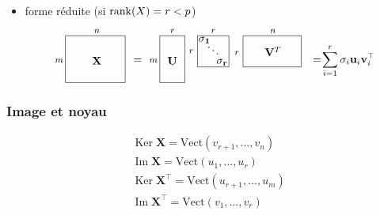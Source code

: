 \documentclass[9pt]{beamer}
\begin{document}
\begin{frame}
\begin{itemize}[label=\tiny$\blacksquare$]
\[{\begin{tikzpicture}[scale=1]
\draw(2.8,0) rectangle (4.7,1.5);
\draw(2.65,0.7) node (eq) {\footnotesize ${p}$};
\draw(3.8,1.65) node (eq) {\footnotesize ${n}$};
\draw(3.9,0.7) node (A) {$\mathbf{V}^{T}$};

\draw(5.3,0.7) node (eq) {${=}$};
\draw(6.3,0.7) node (eq) {$\displaystyle \sum_{i=1}^p \sigma_i \mathbf{u}_i\mathbf{v}_i^\top$};


\end{tikzpicture}}
\]


	\item forme réduite (si $\operatorname{rank}(X) = r < p$)
	\[
\raisebox{-0.35\height}{\begin{tikzpicture}[scale=1]
\draw(-3,0.7) node (A) {$\mathbf{X}$};
\draw(-4.2,0.7) node (eq) {\footnotesize ${m}$};
\draw(-3,1.65) node (eq) {\footnotesize ${n}$};
\draw(-4.0,0) rectangle (-2.1,1.5);
\draw(-1.7,0.7) node (eq) {${=}$};


\draw(-1,0) rectangle (-0.2,1.5);
\draw(-1.2,0.7) node (eq) {\footnotesize ${m}$};
\draw(-0.6,1.65) node (eq) {\footnotesize ${r}$};
\draw(-0.6,0.7) node (U) {$\mathbf{U}$};

\draw(0.2,0.5) rectangle (1.2,1.5);
\draw(0.42,1.36) node (S) {$\mathbf{\sigma_1}$};
\draw(0.7,1.13) node (S) {$\mathbf{\ddots}$};
\draw(0.98,0.65) node (S) {$\mathbf{\sigma_r}$};
\draw(0,1) node (eq) {\footnotesize ${r}$};
\draw(0.7,1.65) node (eq) {\footnotesize ${r}$};


\draw(1.65,0.5) rectangle (3.5,1.5);
\draw(1.45,0.95) node (eq) {\footnotesize ${r}$};
\draw(2.6,1.65) node (eq) {\footnotesize ${n}$};
\draw(2.6,1) node (A) {$\mathbf{V}^{T}$};

\draw(4,0.7) node (eq) {${=}$};
\draw(5,0.7) node (eq) {$\displaystyle \sum_{i=1}^r \sigma_i \mathbf{u}_i\mathbf{v}_i^\top$};



\end{tikzpicture}}
\]
\end{itemize}

\end{frame}


\begin{frame}
\frametitle{Image et noyau}


\vfill
$$
	\begin{aligned}
		&\mathrm{Ker}\; \mathbf{X} = \mathrm{Vect}(v_{r+1},\ldots,v_n)\\
		&\mathrm{Im}\; \mathbf{X} = \mathrm{Vect}(u_1,\ldots,u_r)\\
		&\mathrm{Ker}\; \mathbf{X}^\top = \mathrm{Vect}(u_{r+1},\ldots,u_m)\\
		&\mathrm{Im}\; \mathbf{X}^\top = \mathrm{Vect}(v_1,\ldots,v_r)
	\end{aligned}
$$


\end{frame}
\end{document}
